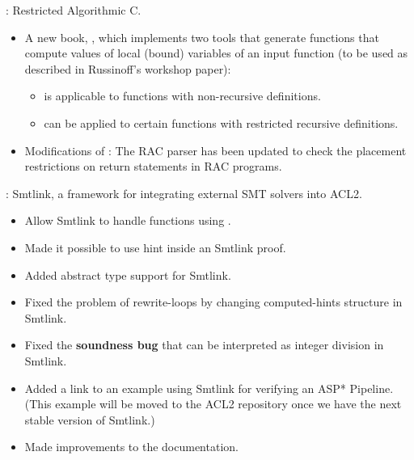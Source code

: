 
\begin{frame}

\implibtitle

:
Restricted Algorithmic C.
\begin{itemize}
\item
A new book, ,
which implements two tools that generate functions that compute
values of local (bound) variables of an input function
(to be used as described in Russinoff's workshop paper):
  \begin{itemize}
  \item {} is applicable to
        functions with non-recursive definitions.
  \item {} can be applied to
        certain functions with restricted recursive definitions.
  \end{itemize}
\item
Modifications of :
The RAC parser has been updated to check the placement restrictions
on return statements in RAC programs.
\end{itemize}

\end{frame}


\begin{frame}

\implibtitle

:
Smtlink, a framework for integrating external SMT solvers into ACL2.
\begin{itemize}
\item
Allow Smtlink to handle functions using .
\item
Made it possible to use  hint inside an Smtlink proof.
\item
Added abstract type support for Smtlink.
\item
Fixed the problem of rewrite-loops by changing computed-hints structure in Smtlink.
\item
Fixed the {\color{red} \bf{soundness bug}} that  can be interpreted as integer division in Smtlink.
\item
Added a link to an example using Smtlink for verifying an ASP* Pipeline. (This example will be moved to the ACL2 repository once we have the next stable version of Smtlink.)
\item
Made improvements to the documentation.
\end{itemize}

\end{frame}

